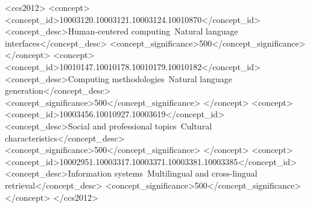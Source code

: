 \documentclass[sigconf]{acmart}
\begin{document}
\begin{CCSXML}
<ccs2012>
   <concept>
       <concept_id>10003120.10003121.10003124.10010870</concept_id>
       <concept_desc>Human-centered computing~Natural language interfaces</concept_desc>
       <concept_significance>500</concept_significance>
       </concept>
   <concept>
       <concept_id>10010147.10010178.10010179.10010182</concept_id>
       <concept_desc>Computing methodologies~Natural language generation</concept_desc>
       <concept_significance>500</concept_significance>
       </concept>
   <concept>
       <concept_id>10003456.10010927.10003619</concept_id>
       <concept_desc>Social and professional topics~Cultural characteristics</concept_desc>
       <concept_significance>500</concept_significance>
       </concept>
   <concept>
       <concept_id>10002951.10003317.10003371.10003381.10003385</concept_id>
       <concept_desc>Information systems~Multilingual and cross-lingual retrieval</concept_desc>
       <concept_significance>500</concept_significance>
       </concept>
 </ccs2012>
\end{CCSXML}




\maketitle
\end{document}
